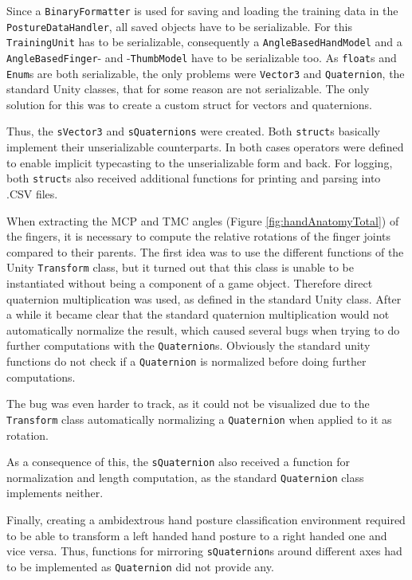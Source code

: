 Since a \texttt{BinaryFormatter} is used for saving and loading the training data in the \texttt{PostureDataHandler}, all saved objects have to be serializable. For this \texttt{TrainingUnit} has to be serializable, consequently a \texttt{AngleBasedHandModel} and a \texttt{AngleBasedFinger}- and -\texttt{ThumbModel} have to be serializable too. As \texttt{float}s and \texttt{Enum}s are both serializable, the only problems were \texttt{Vector3} and \texttt{Quaternion}, the standard Unity classes, that for some reason are not serializable. The only solution for this was to create a custom struct for vectors and quaternions. 

Thus, the \texttt{sVector3} and \texttt{sQuaternions} were created. Both \texttt{struct}s basically implement their unserializable counterparts. In both cases operators were defined to enable implicit typecasting to the unserializable form and back. For logging, both \texttt{struct}s also received additional functions for printing and parsing into .CSV files.

When extracting the MCP and TMC angles (Figure \ref{fig:handAnatomyTotal}) of the fingers, it is necessary to compute the relative rotations of the finger joints compared to their parents. The first idea was to use the different functions of the Unity \texttt{Transform} class, but it turned out that this class is unable to be instantiated without being a component of a game object. Therefore direct quaternion multiplication was used, as defined in the standard Unity class. After a while it became clear that the standard quaternion multiplication would not automatically normalize the result, which caused several bugs when trying to do further computations with the \texttt{Quaternion}s. Obviously the standard unity functions do not check if a \texttt{Quaternion} is normalized before doing further computations. 

The bug was even harder to track, as it could not be visualized due to the \texttt{Transform} class automatically normalizing a \texttt{Quaternion} when applied to it as rotation.

As a consequence of this, the \texttt{sQuaternion} also received a function for normalization and length computation, as the standard \texttt{Quaternion} class implements neither.

Finally, creating a ambidextrous hand posture classification environment required to be able to transform a left handed hand posture to a right handed one and vice versa. Thus, functions for mirroring \texttt{sQuaternion}s around different axes had to be implemented as \texttt{Quaternion} did not provide any.

